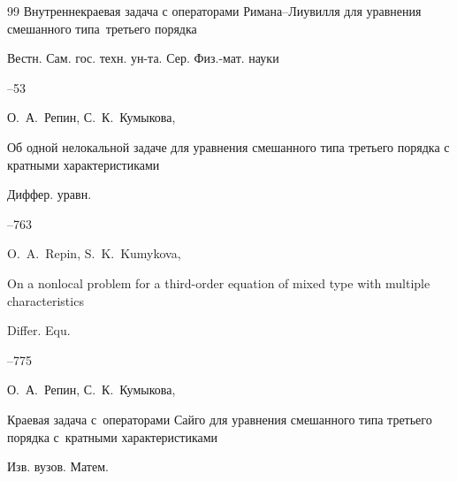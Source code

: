 \begin{thebibliography}{99}
\paper Внутреннекраевая задача с операторами Римана--Лиувилля для уравнения смешанного типа~третьего порядка

\jour Вестн. Сам. гос. техн. ун-та. Сер. Физ.-мат. науки




--53








\by О.~А.~Репин, С.~К.~Кумыкова,

\paper  Об одной нелокальной задаче для уравнения смешанного типа третьего порядка с кратными характеристиками 

\jour Диффер. уравн.




--763

\transl 

\by O.~A.~Repin,  S.~K.~Kumykova,

\by On a nonlocal problem for a third-order equation of mixed type with multiple characteristics

\jour Differ. Equ. 



--775












\by О.~А.~Репин, С.~К.~Кумыкова,

\paper Краевая задача с~операторами Сайго для уравнения смешанного типа третьего порядка с~кратными характеристиками

\jour Изв. вузов. Матем.




\end{thebibliography}
